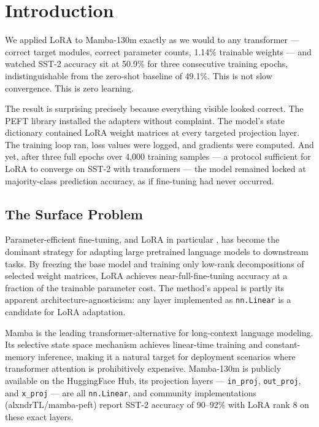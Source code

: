 \section{Introduction}

We applied LoRA to Mamba-130m exactly as we would to any transformer --- correct target modules, correct parameter counts, 1.14\% trainable weights --- and watched SST-2 accuracy sit at 50.9\% for three consecutive training epochs, indistinguishable from the zero-shot baseline of 49.1\%. This is not slow convergence. This is zero learning.

The result is surprising precisely because everything visible looked correct. The PEFT library installed the adapters without complaint. The model's state dictionary contained LoRA weight matrices at every targeted projection layer. The training loop ran, loss values were logged, and gradients were computed. And yet, after three full epochs over 4,000 training samples --- a protocol sufficient for LoRA to converge on SST-2 with transformers --- the model remained locked at majority-class prediction accuracy, as if fine-tuning had never occurred.

\subsection{The Surface Problem}

Parameter-efficient fine-tuning, and LoRA in particular \citep{hu2022lora}, has become the dominant strategy for adapting large pretrained language models to downstream tasks. By freezing the base model and training only low-rank decompositions of selected weight matrices, LoRA achieves near-full-fine-tuning accuracy at a fraction of the trainable parameter cost. The method's appeal is partly its apparent architecture-agnosticism: any layer implemented as \texttt{nn.Linear} is a candidate for LoRA adaptation.

Mamba \citep{gu2023mamba} is the leading transformer-alternative for long-context language modeling. Its selective state space mechanism achieves linear-time training and constant-memory inference, making it a natural target for deployment scenarios where transformer attention is prohibitively expensive. Mamba-130m is publicly available on the HuggingFace Hub, its projection layers --- \texttt{in\_proj}, \texttt{out\_proj}, and \texttt{x\_proj} --- are all \texttt{nn.Linear}, and community implementations (alxndrTL/mamba-peft) report SST-2 accuracy of 90--92\% with LoRA rank 8 on these exact layers.

